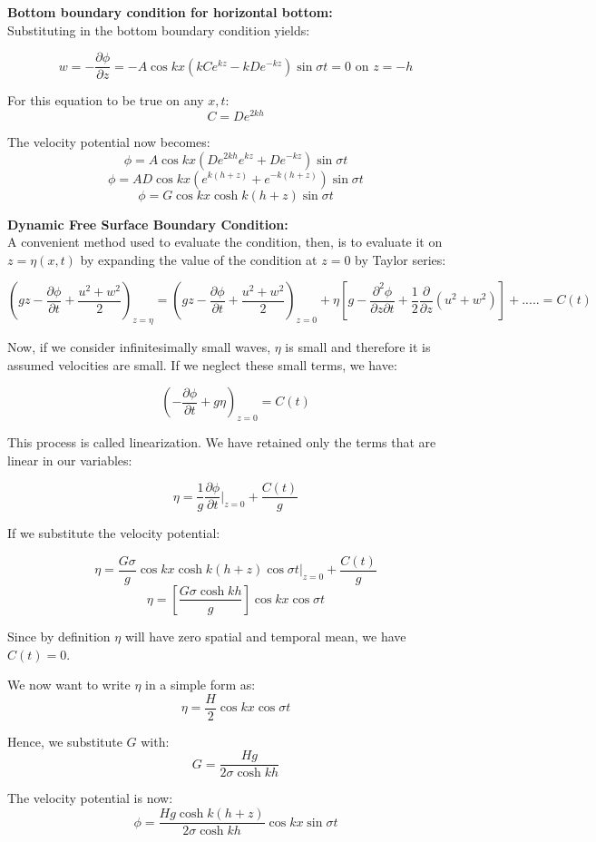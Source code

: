\documentclass{report}
\begin{document}
\textbf{Bottom boundary condition for horizontal bottom:}\\
Substituting in the bottom boundary condition yields:

\[ w= -\frac{\partial\phi}{\partial z} = -A\cos kx(kCe^{kz}-kDe^{-kz})\sin\sigma t =0 \text{ on } z=-h \]

For this equation to be true on any \( x, t \):
\[ C=De^{2kh} \] 

The velocity potential now becomes:
\[ \phi =A\cos kx(De^{2kh}e^{kz}+De^{-kz})\sin\sigma t \]
\[ \phi =AD\cos kx(e^{k(h+z)}+e^{-k(h+z)})\sin\sigma t \]
\[ \phi =G \cos kx \cosh k(h+z)\sin\sigma t \]

\textbf{Dynamic Free Surface Boundary Condition:}\\
A convenient method used to evaluate the condition, then, is to evaluate it on \( z=\eta(x,t) \) by expanding the value of the condition at \( z=0 \) by Taylor series:

\[ \left(gz-\frac{\partial\phi}{\partial t} + \frac{u^2+w^2}{2}\right)_{z=\eta} = \left(gz-\frac{\partial\phi}{\partial t} + \frac{u^2+w^2}{2}\right)_{z=0} + \eta\left[g-\frac{{\partial}^2\phi}{\partial z \partial t} + \frac{1}{2}\frac{\partial}{\partial z}(u^2 + w^2)\right] + ..... = C(t) \]

Now, if we consider infinitesimally small waves, \( \eta \) is small and therefore it is assumed velocities are small. If we neglect these small terms, we have:

\[ \left( -\frac{\partial\phi}{\partial t} + g\eta \right)_{z=0} = C(t) \]

This process is called linearization. We have retained only the terms that are linear in our variables:

\[ \eta=\frac{1}{g} \frac{\partial\phi}{\partial t}\bigg|_{z=0} + \frac{C(t)}{g} \]

If we substitute the velocity potential:

\[ \eta = \frac{G\sigma}{g} \cos kx \cosh k(h+z) \cos \sigma t \bigg|_{z=0} + \frac{C(t)}{g} \]
\[ \eta = \left[\frac{G\sigma \cosh kh}{g}\right] \cos kx \cos \sigma t \]

Since by definition \( \eta \) will have zero spatial and temporal mean, we have \( C(t)=0 \).

We now want to write \( \eta \) in a simple form as:
\[ \eta=\frac{H}{2} \cos kx \cos \sigma t \]

Hence, we substitute \( G \) with:
\[ G = \frac{Hg}{2\sigma \cosh kh} \]

The velocity potential is now:
\[ \phi = \frac{Hg\cosh k(h+z)}{2\sigma \cosh kh} \cos kx \sin \sigma t \]
\end{document}
